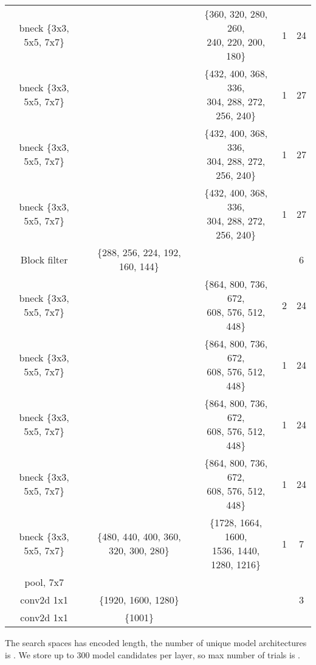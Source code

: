 \begin{table}
\begin{center}
\begin{tabular}[hp]{c|c|c|c|c}
  bneck \{3x3, 5x5, 7x7\} & &\shortstack{\{360, 320, 280, 260, \\ 240, 220, 200, 180\}} &1 &24 \\
  bneck \{3x3, 5x5, 7x7\} & &\shortstack{\{432, 400, 368, 336, \\304, 288, 272, 256, 240\}} &1 &27 \\
  bneck \{3x3, 5x5, 7x7\} & &\shortstack{\{432, 400, 368, 336, \\304, 288, 272, 256, 240\}} &1 &27 \\
   bneck \{3x3, 5x5, 7x7\} & &\shortstack{\{432, 400, 368, 336, \\ 304, 288, 272, 256, 240\}} &1 &27 \\
\hline

Block filter &\{288, 256, 224, 192, 160, 144\} & & &6 \\
  bneck \{3x3, 5x5, 7x7\} & &\shortstack{\{864, 800, 736, 672, \\ 608, 576, 512, 448\}} &2 &24 \\
  bneck \{3x3, 5x5, 7x7\} & &\shortstack{\{864, 800, 736, 672, \\608, 576, 512, 448\}} &1 &24 \\
  bneck \{3x3, 5x5, 7x7\} & &\shortstack{\{864, 800, 736, 672, \\608, 576, 512, 448\}} &1 &24 \\
  bneck \{3x3, 5x5, 7x7\} & &\shortstack{\{864, 800, 736, 672, \\608, 576, 512, 448\}} &1 &24 \\
\hline
  bneck \{3x3, 5x5, 7x7\} &\{480, 440, 400, 360, 320, 300, 280\} &\shortstack{\{1728, 1664, 1600, \\ 1536, 1440, 1280, 1216\}} &1 &7 \\
\hline
  pool, 7x7  & & &\\
  conv2d 1x1  &\{1920, 1600, 1280\} & & &3 \\
  conv2d 1x1 &\{1001\} & & \\
\hline
\hline

\end{tabular}
\end{center}
\end{table}

The search spaces has  encoded length, the number of unique model architectures is .
We store up to 300 model candidates per layer, so max number of trials is .


